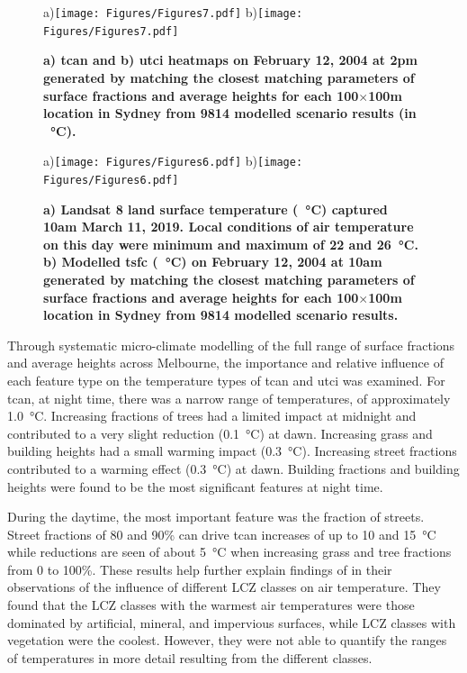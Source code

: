 \documentclass[final,3p,times,authoryear]{elsarticle}
\begin{document}
\begin{figure}
\centering
a)\texttt{[image: Figures/Figures7.pdf]}
b)\texttt{[image: Figures/Figures7.pdf]}
\caption{\bf a) \gls{tcan} and b) \gls{utci} heatmaps on February 12, 2004 at 2pm generated by matching the closest matching parameters of surface fractions and average heights for each 100$\times$100m location in Sydney from 9814 modelled scenario results (in \SI{}{\degreeCelsius}).  }
 \label{fig:TaSyd} \label{fig:utciSyd}
\end{figure}




\begin{figure} 
\centering
a)\texttt{[image: Figures/Figures6.pdf]}
b)\texttt{[image: Figures/Figures6.pdf]}
\caption{\bf a) Landsat 8 land surface temperature (\SI{}{\degreeCelsius}) captured 10am March 11, 2019. Local conditions of air temperature on this day were minimum and maximum of 22 and 26\SI{}{\degreeCelsius}. b) Modelled \gls{tsfc} (\SI{}{\degreeCelsius}) on February 12, 2004 at 10am generated by matching the closest matching parameters of surface fractions and average heights for each 100$\times$100m location in Sydney from 9814 modelled scenario results.}
 \label{fig:Sydney-Landsat-LST-11-03-2019}
 \label{fig:Sydney_TSFC12_85}
\end{figure}

Through systematic micro-climate modelling of the full range of surface fractions and average heights across Melbourne, the importance and relative influence of each feature type on the temperature types of \gls{tcan} and \gls{utci} was examined. For \gls{tcan}, at night time, there was a narrow range of temperatures, of approximately 1.0\SI{}{\degreeCelsius}. Increasing fractions of trees had a limited impact at midnight and contributed to a very slight reduction (0.1\SI{}{\degreeCelsius}) at dawn. Increasing grass and building heights had a small warming impact (0.3\SI{}{\degreeCelsius}). Increasing street fractions contributed to a warming effect (0.3\SI{}{\degreeCelsius}) at dawn. Building fractions and building heights were found to be the most significant features at night time.

During the daytime, the most important feature was the fraction of streets. Street fractions of 80 and 90\% can drive \gls{tcan} increases of up to 10 and 15\SI{}{\degreeCelsius} while reductions are seen of about 5\SI{}{\degreeCelsius} when increasing grass and tree fractions from 0 to 100\%. These results help further explain findings of \cite{Emery2021} in their observations of the influence of different LCZ classes on air temperature. They found that the LCZ classes with the warmest air temperatures were those dominated by artificial, mineral, and impervious surfaces, while LCZ classes with vegetation were the coolest. However, they were not able to quantify the ranges of temperatures in more detail resulting from the different classes.
\end{document}
